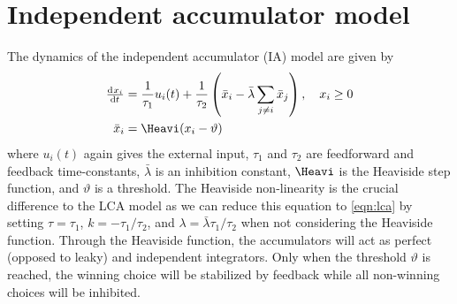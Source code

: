 \section{Independent accumulator model}\label{sec:ia}
The dynamics of the independent accumulator (IA) model are given by
\begin{align}
    \od{x_i}{t} &= \frac{1}{\tau_1} u_i(t) + \frac{1}{\tau_2} \del{\bar{x}_i - \bar{\lambda} \sum_{j \neq i} \bar{x}_j}, \quad x_i \geq 0 \\
    \bar{x}_i &= \Heavi(x_i - \vartheta)
\end{align}
where $u_i(t)$ again gives the external input, $\tau_1$ and $\tau_2$ are feedforward and feedback time-constants, $\bar{\lambda}$ is an inhibition constant, $\Heavi$ is the Heaviside step function, and $\vartheta$ is a threshold.
The Heaviside non-linearity is the crucial difference to the LCA model as we can reduce this equation to \cref{eqn:lca} by setting $\tau = \tau_1$, $k = -\tau_1/\tau_2$, and $\lambda = \bar{\lambda} \tau_1/\tau_2$ when not considering the Heaviside function.
Through the Heaviside function, the accumulators will act as perfect (opposed to leaky) and independent integrators.
Only when the threshold $\vartheta$ is reached, the winning choice will be stabilized by feedback while all non-winning choices will be inhibited.

